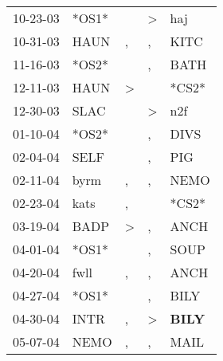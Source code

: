\begin{supertabular}{p{0.07\textwidth}p{0.06\textwidth}p{0.02\textwidth}p{0.02\textwidth}p{0.06\textwidth}}
          10-23-03\textsuperscript{} &                            *OS1* &                  &  \textgreater &            haj\textsuperscript{} \\
          10-31-03\textsuperscript{} &           HAUN\textsuperscript{} &                , &             , &           KITC\textsuperscript{} \\
          11-16-03\textsuperscript{} &                            *OS2* &                  &             , &           BATH\textsuperscript{} \\
          12-11-03\textsuperscript{} &           HAUN\textsuperscript{} &     \textgreater &               &                            *CS2* \\
          12-30-03\textsuperscript{} &           SLAC\textsuperscript{} &                  &  \textgreater &            n2f\textsuperscript{} \\
          01-10-04\textsuperscript{} &                            *OS2* &                  &             , &           DIVS\textsuperscript{} \\
          02-04-04\textsuperscript{} &           SELF\textsuperscript{} &                  &             , &            PIG\textsuperscript{} \\
          02-11-04\textsuperscript{} &           byrm\textsuperscript{} &                , &             , &           NEMO\textsuperscript{} \\
          02-23-04\textsuperscript{} &           kats\textsuperscript{} &                , &               &                            *CS2* \\
          03-19-04\textsuperscript{} &           BADP\textsuperscript{} &     \textgreater &             , &           ANCH\textsuperscript{} \\
          04-01-04\textsuperscript{} &                            *OS1* &                  &             , &           SOUP\textsuperscript{} \\
          04-20-04\textsuperscript{} &           fwll\textsuperscript{} &                , &             , &           ANCH\textsuperscript{} \\
          04-27-04\textsuperscript{} &                            *OS1* &                  &             , &           BILY\textsuperscript{} \\
          04-30-04\textsuperscript{} &           INTR\textsuperscript{} &                , &  \textgreater &  \textbf{BILY\textsuperscript{}} \\
          05-07-04\textsuperscript{} &           NEMO\textsuperscript{} &                , &             , &           MAIL\textsuperscript{} \\

\end{supertabular}

